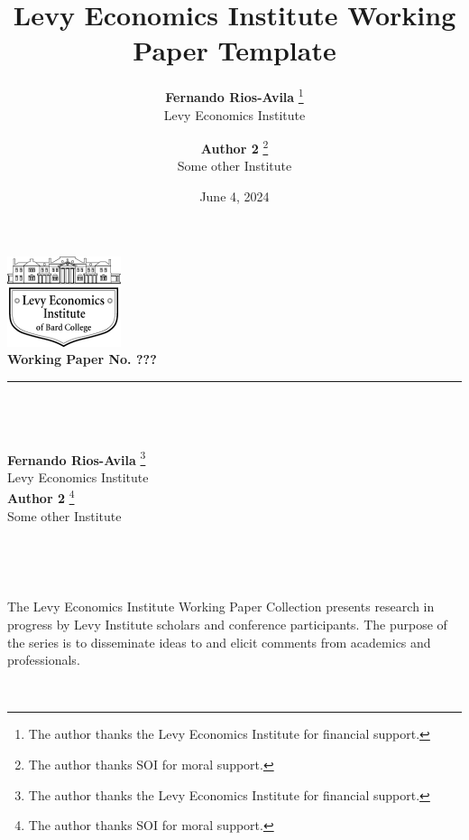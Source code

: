 \documentclass[
  12pt,
]{article}
\title{
        Levy Economics Institute Working Paper Template
            }
\author{
\textbf{Fernando Rios-Avila}
\footnote{The author thanks the Levy Economics Institute for financial
support.}\\
Levy Economics Institute\\[0.5cm]
\and 
\textbf{Author 2}
\footnote{The author thanks SOI for moral support.}\\
Some other Institute\\[0.5cm]
}
\date{June 4, 2024}
\begin{document}
\let\origfootnoterule\footnoterule
\renewcommand{\footnoterule}{}



\begin{titlepage}

\begin{minipage}[t][0.70\textheight][t]{\textwidth} 
\renewcommand{\thempfootnote}{\fnsymbol{mpfootnote}} 
    \centering
    \includegraphics[width=0.25\textwidth]{logo.png}\\[0.25cm]
    \textbf{\large{\textcolor{levyblue}{Working Paper No. ???}}}\\[0.3cm]

    \textcolor{lightgray}{\rule{0.8\textwidth}{0.5mm}}\\[0.5cm]

     \\[0.5cm]
     
     \\[0.5cm]

 
 \textbf{Fernando Rios-Avila}
 \footnote{The author thanks the Levy Economics Institute for financial
 support.}\\
 Levy Economics Institute\\[0.5cm]

 \textbf{Author 2}
 \footnote{The author thanks SOI for moral support.}\\
 Some other Institute\\[0.5cm]



 \vfill 
 ~
 \end{minipage}
 

\center{\textcolor{lightgray}{\rule{0.8\textwidth}{0.5mm}}}\\[0.5cm]
        \vfill
    \begin{minipage}[b][0.20\textheight][b]{\textwidth}
    
        
        \begin{minipage}{\textwidth}
            \small
            The Levy Economics Institute Working Paper Collection presents research in progress by Levy Institute scholars and conference participants. The purpose of the series is to disseminate ideas to and elicit comments from academics and professionals.
        \end{minipage}\\[0.5cm]


\end{minipage}
\end{titlepage}
\end{document}
